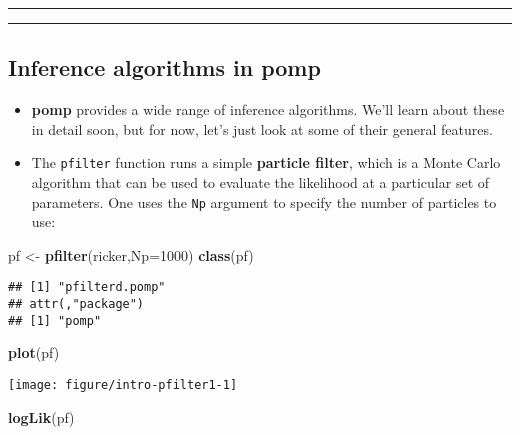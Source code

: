 \documentclass[]{article}
\newenvironment{Shaded}{\begin{snugshade}}{\end{snugshade}}
\newcommand{\KeywordTok}[1]{\textcolor[rgb]{0.13,0.29,0.53}{\textbf{#1}}}
\newcommand{\DataTypeTok}[1]{\textcolor[rgb]{0.13,0.29,0.53}{#1}}
\newcommand{\DecValTok}[1]{\textcolor[rgb]{0.00,0.00,0.81}{#1}}
\newcommand{\StringTok}[1]{\textcolor[rgb]{0.31,0.60,0.02}{#1}}
\newcommand{\NormalTok}[1]{#1}
\begin{document}
\begin{center}\rule{0.5\linewidth}{\linethickness}\end{center}

\begin{center}\rule{0.5\linewidth}{\linethickness}\end{center}

\subsection{\texorpdfstring{Inference algorithms in
\textbf{pomp}}{Inference algorithms in pomp}}\label{inference-algorithms-in-pomp}

\begin{itemize}
\item
  \textbf{pomp} provides a wide range of inference algorithms. We'll
  learn about these in detail soon, but for now, let's just look at some
  of their general features.
\item
  The \texttt{pfilter} function runs a simple \textbf{particle filter},
  which is a Monte Carlo algorithm that can be used to evaluate the
  likelihood at a particular set of parameters. One uses the \texttt{Np}
  argument to specify the number of particles to use:
\end{itemize}

\begin{Shaded}
\begin{Highlighting}[]
\NormalTok{pf <-}\StringTok{ }\KeywordTok{pfilter}\NormalTok{(ricker,}\DataTypeTok{Np=}\DecValTok{1000}\NormalTok{)}
\KeywordTok{class}\NormalTok{(pf)}
\end{Highlighting}
\end{Shaded}

\begin{verbatim}
## [1] "pfilterd.pomp"
## attr(,"package")
## [1] "pomp"
\end{verbatim}

\begin{Shaded}
\begin{Highlighting}[]
\KeywordTok{plot}\NormalTok{(pf)}
\end{Highlighting}
\end{Shaded}

\begin{center}\texttt{[image: figure/intro-pfilter1-1]} \end{center}

\begin{Shaded}
\begin{Highlighting}[]
\KeywordTok{logLik}\NormalTok{(pf)}
\end{Highlighting}
\end{Shaded}
\end{document}
